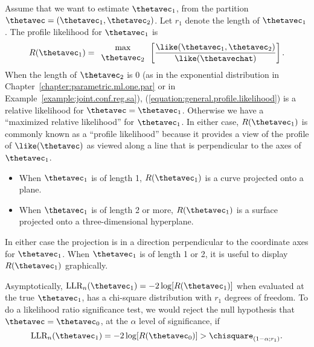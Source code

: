Assume that we want to estimate $\thetavec_{1}$, from the partition
$\thetavec=(\thetavec_{1},\thetavec_{2})$.  Let $r_{1}$ denote the
length of $\thetavec_{1}$.  The profile likelihood for
$\thetavec_{1}$ is
\begin{equation} 
\label{equation:general.profile.likelihood}
R(\thetavec_{1}) = \begin{array}{c} \max  \\ \thetavec_{2}
\end{array}
\left[\frac{\like(\thetavec_{1},\thetavec_{2})}
{\like(\thetavechat)}\right].
\end{equation}
When the length of $\thetavec_{2}$ is 0 (as in the exponential
distribution in Chapter~\ref{chapter:parametric.ml.one.par} or in
Example~\ref{example:joint.conf.reg.sa}),
(\ref{equation:general.profile.likelihood}) is a relative likelihood
for $\thetavec=\thetavec_{1}$.  Otherwise we have a ``maximized
relative likelihood'' for $\thetavec_{1}$. In either case,
$R(\thetavec_{1})$ is commonly known as a ``profile likelihood''
because it provides a view of the profile of $\like(\thetavec)$ as
viewed along a line that is perpendicular to the axes of
$\thetavec_{1}$.  
\begin{itemize}
\item
When $\thetavec_{1}$ is of length 1, $R(\thetavec_{1})$ is a curve
projected onto a plane.
\item
When $\thetavec_{1}$ is of length 2 or more, $R(\thetavec_{1})$
is a surface projected onto a three-dimensional hyperplane.
\end{itemize}
In either case the projection is in a direction perpendicular to the
coordinate axes for $\thetavec_{1}$.  When $\thetavec_{1}$ is of
length 1 or 2, it is useful to display $R(\thetavec_{1})$ graphically.


Asymptotically, $\mbox{LLR}_{n}(\thetavec_{1}) = -2
\log[R(\thetavec_{1})]$ when evaluated at the true $\thetavec_{1}$,
has a chi-square distribution with $r_{1}$ degrees of freedom. To
do a likelihood ratio significance test, we would reject the null
hypothesis that $\thetavec=\thetavec_{0}$, at the $\alpha$ level of
significance, if
\begin{displaymath}
\mbox{LLR}_{n}(\thetavec_{1}) = 
	-2 \log[R(\thetavec_{0})] > \chisquare_{(1-\alpha;r_{1})}.
\end{displaymath}


